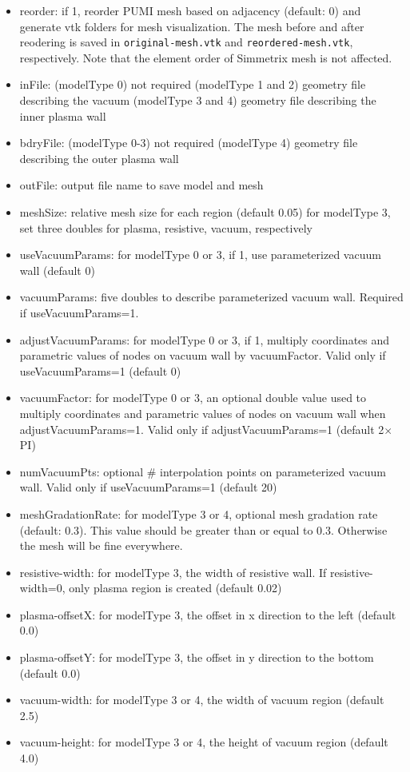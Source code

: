 \begin{itemize}
\item reorder: if 1, reorder PUMI mesh based on adjacency (default: 0) and generate vtk folders for mesh visualization. The mesh before and after reodering is saved in \texttt{original-mesh.vtk} and \texttt{reordered-mesh.vtk}, respectively. Note that the element order of Simmetrix mesh is not affected.
\item inFile: (modelType 0) not required
(modelType 1 and 2) geometry file describing the vacuum (modelType 3 and 4) geometry file describing the inner plasma wall
\item bdryFile: (modelType 0-3) not required
 (modelType 4) geometry file describing the outer plasma wall
\item outFile: output file name to save model and mesh
\item meshSize: relative mesh size for each region (default 0.05)
\newline
	for modelType 3, set three doubles for plasma, resistive, vacuum, respectively
\item useVacuumParams: for modelType 0 or 3, if 1, use parameterized vacuum wall (default 0)
\item vacuumParams: five doubles to describe parameterized vacuum wall. Required if useVacuumParams=1.
\item adjustVacuumParams: for modelType 0 or 3, if 1, multiply coordinates and parametric values of nodes on vacuum wall by vacuumFactor. Valid only if useVacuumParams=1 (default 0)
\item vacuumFactor: for modelType 0 or 3, an optional double value used to multiply coordinates and parametric values of nodes on vacuum wall when adjustVacuumParams=1. Valid only if adjustVacuumParams=1 (default 2$\times$PI)
\item numVacuumPts: optional \# interpolation points on parameterized vacuum wall. Valid only if useVacuumParams=1 (default 20)
\item meshGradationRate: for modelType 3 or 4, optional mesh gradation rate (default: 0.3). This value should be greater than or equal to 0.3. Otherwise the mesh will be fine everywhere.
\item resistive-width: for modelType 3, the width of resistive wall. If resistive-width=0, only plasma region is created (default 0.02)
\item plasma-offsetX: for modelType 3, the offset in x direction to the left (default 0.0)
\item plasma-offsetY: for modelType 3, the offset in y direction to the bottom (default 0.0)
\item vacuum-width: for modelType 3 or 4, the width of vacuum region (default 2.5)
\item vacuum-height: for modelType 3 or 4, the height of vacuum region (default 4.0) 
\end{itemize}

